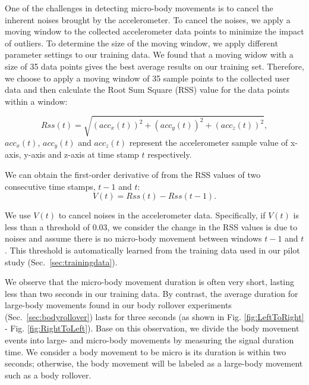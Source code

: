  One of the challenges in detecting micro-body movements is to cancel the inherent noises brought by the
accelerometer. To cancel the noises, we apply a moving window to the collected accelerometer data points to minimize the impact of
outliers. To determine the size of the moving window, we apply different parameter settings to our training data. We found that a moving
widow with a size of 35 data points gives the best average results on our training set. Therefore, we choose to apply a moving window of 35
sample points to the collected user data and then calculate the Root Sum Square (RSS) value for the data points within a window:

\begin{equation}
      Rss(t) =\sqrt{(acc_x(t))^{2}+(acc_y(t))^{2}+(acc_z(t))^{2}},
\end{equation}
$acc_x(t)$, $acc_y(t)$ and $acc_z(t)$ represent the accelerometer sample value of x-axis, y-axis and z-axis at time stamp $t$ respectively.


We can obtain the first-order derivative of from the RSS values of two consecutive time stamps, $t-1$ and $t$:
\begin{equation}
      V(t)=Rss(t)-Rss(t-1).
      \label{eq:nc}
\end{equation}

We use $V(t)$ to cancel noises in the accelerometer data. Specifically, if $V(t)$ is less than a threshold of $0.03$, we consider the
change in the RSS values is due to noises and assume there is no micro-body movement between windows $t-1$ and $t$. This threshold is
automatically learned from the training data used in our pilot study (Sec.~\ref{sec:trainingdata}).


 We observe that the micro-body movement duration is often very short, lasting less
than two seconds in our training data. By contrast, the average duration for large-body movements found in our body rollover experiments
(Sec.~\ref{sec:bodyrollover}) lasts for three seconds (as shown in Fig. \ref{fig:LeftToRight} - Fig. \ref{fig:RightToLeft}). Base on this
observation, we divide the body movement events into large- and micro-body movements by measuring the signal duration time. We consider a
body movement to be micro is its duration is within two seconds; otherwise, the body movement will be labeled as a large-body movement such
as a body rollover.

